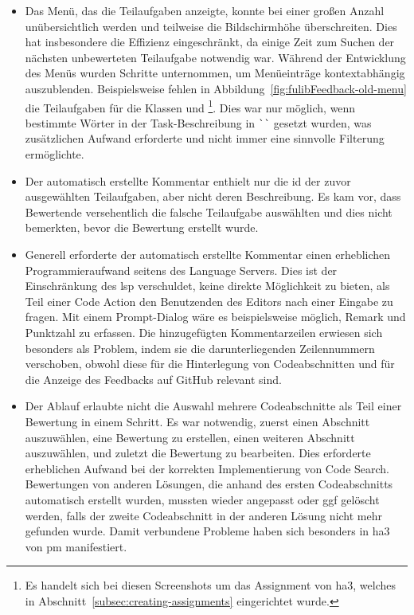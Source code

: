 \begin{itemize}
    \item Das Menü, das die Teilaufgaben anzeigte, konnte bei einer großen Anzahl unübersichtlich werden und teilweise die Bildschirmhöhe überschreiten.
    Dies hat insbesondere die Effizienz eingeschränkt, da einige Zeit zum Suchen der nächsten unbewerteten Teilaufgabe notwendig war.
    Während der Entwicklung des Menüs wurden Schritte unternommen, um Menüeinträge kontextabhängig auszublenden.
    Beispielsweise fehlen in Abbildung~\ref{fig:fulibFeedback-old-menu} die Teilaufgaben für die Klassen  und \footnote{
        Es handelt sich bei diesen Screenshots um das Assignment von \ac{ha}3, welches in Abschnitt~\ref{subsec:creating-assignments} eingerichtet wurde.
    }.
    Dies war nur möglich, wenn bestimmte Wörter in der Task-Beschreibung in \verb|``| gesetzt wurden, was zusätzlichen Aufwand erforderte und nicht immer eine sinnvolle Filterung ermöglichte.
    \item Der automatisch erstellte Kommentar enthielt nur die \ac{id} der zuvor ausgewählten Teilaufgaben, aber nicht deren Beschreibung.
    Es kam vor, dass Bewertende versehentlich die falsche Teilaufgabe auswählten und dies nicht bemerkten, bevor die Bewertung erstellt wurde.
    \item Generell erforderte der automatisch erstellte Kommentar einen erheblichen Programmieraufwand seitens des Language Servers.
    Dies ist der Einschränkung des \ac{lsp} verschuldet, keine direkte Möglichkeit zu bieten, als Teil einer Code Action den Benutzenden des Editors nach einer Eingabe zu fragen.
    Mit einem Prompt-Dialog wäre es beispielsweise möglich, Remark und Punktzahl zu erfassen.
    Die hinzugefügten Kommentarzeilen erwiesen sich besonders als Problem, indem sie die darunterliegenden Zeilennummern verschoben, obwohl diese für die Hinterlegung von Codeabschnitten und für die Anzeige des Feedbacks auf GitHub relevant sind.
    \item Der Ablauf erlaubte nicht die Auswahl mehrere Codeabschnitte als Teil einer Bewertung in einem Schritt.
    Es war notwendig, zuerst einen Abschnitt auszuwählen, eine Bewertung zu erstellen, einen weiteren Abschnitt auszuwählen, und zuletzt die Bewertung zu bearbeiten.
    Dies erforderte erheblichen Aufwand bei der korrekten Implementierung von Code Search.
    Bewertungen von anderen Lösungen, die anhand des ersten Codeabschnitts automatisch erstellt wurden, mussten wieder angepasst oder \ac{ggf} gelöscht werden, falls der zweite Codeabschnitt in der anderen Lösung nicht mehr gefunden wurde.
    Damit verbundene Probleme haben sich besonders in \ac{ha}3 von \ac{pm} manifestiert.
\end{itemize}

